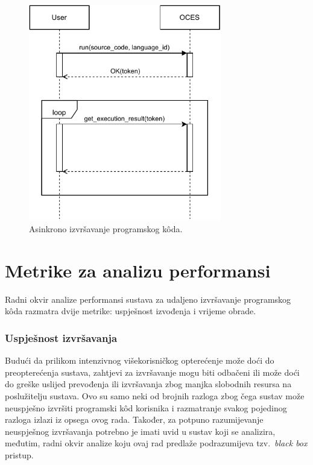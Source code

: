 \documentclass[times, utf8, diplomski]{fer}
\begin{document}
\begin{figure}[htb]
	\centering
	\includegraphics[width=0.75\textwidth]{images/async-execution.pdf}
	\caption{
		Asinkrono izvršavanje programskog kôda.
	}
	\label{fig:async-execution}
\end{figure}

\section{Metrike za analizu performansi}
Radni okvir analize performansi sustava za udaljeno izvršavanje programskog kôda razmatra dvije metrike: uspješnost izvođenja i vrijeme obrade.

\subsubsection{Uspješnost izvršavanja}
Budući da prilikom intenzivnog višekorisničkog opterećenje može doći do preopterećenja sustava, zahtjevi za izvršavanje mogu biti odbačeni ili može doći do greške uslijed prevođenja ili izvršavanja zbog manjka slobodnih resursa na poslužitelju sustava. Ovo su samo neki od brojnih razloga zbog čega sustav može neuspješno izvršiti programski kôd korisnika i razmatranje svakog pojedinog razloga izlazi iz opsega ovog rada. Također, za potpuno razumijevanje neuspješnog izvršavanja potrebno je imati uvid u sustav koji se analizira, međutim, radni okvir analize koju ovaj rad predlaže podrazumijeva tzv.\ \textit{black box} pristup.
\end{document}
